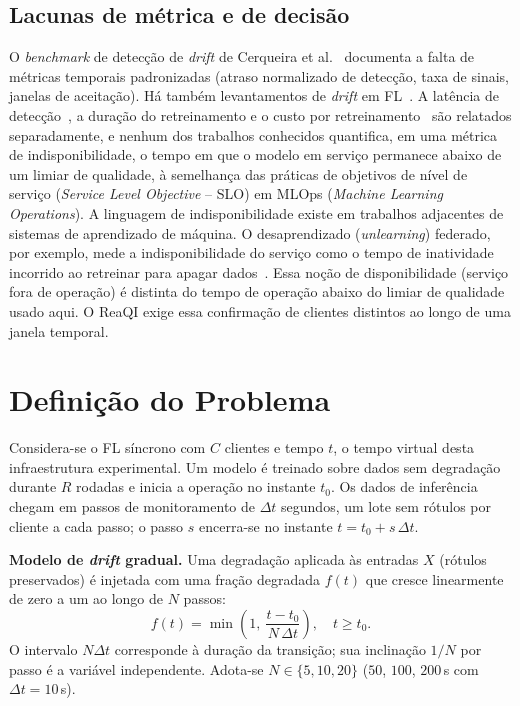 \documentclass[conference]{IEEEtran}
\begin{document}
\subsection{Lacunas de métrica e de decisão}
O \textit{benchmark} de detecção de \textit{drift} de Cerqueira et al.~\cite{cerqueira2026} documenta a falta de métricas temporais padronizadas (atraso normalizado de detecção, taxa de sinais, janelas de aceitação). Há também levantamentos de \textit{drift} em FL~\cite{mahdi2025}. A latência de detecção~\cite{baier2023,chow2023}, a duração do retreinamento e o custo por retreinamento~\cite{han2026} são relatados separadamente, e nenhum dos trabalhos conhecidos quantifica, em uma métrica de indisponibilidade, o tempo em que o modelo em serviço permanece abaixo de um limiar de qualidade, à semelhança das práticas de objetivos de nível de serviço (\textit{Service Level Objective} -- SLO) em MLOps (\textit{Machine Learning Operations}). A linguagem de indisponibilidade existe em trabalhos adjacentes de sistemas de aprendizado de máquina. O desaprendizado (\textit{unlearning}) federado, por exemplo, mede a indisponibilidade do serviço como o tempo de inatividade incorrido ao retreinar para apagar dados~\cite{zhang2025}. Essa noção de disponibilidade (serviço fora de operação) é distinta do tempo de operação abaixo do limiar de qualidade usado aqui. O ReaQI exige essa confirmação de clientes distintos ao longo de uma janela temporal.

\section{Definição do Problema}
Considera-se o FL síncrono com $C$ clientes e tempo $t$, o tempo virtual desta infraestrutura experimental. Um modelo é treinado sobre dados sem degradação durante $R$ rodadas e inicia a operação no instante $t_0$. Os dados de inferência chegam em passos de monitoramento de $\Delta t$ segundos, um lote sem rótulos por cliente a cada passo; o passo $s$ encerra-se no instante $t=t_0+s\,\Delta t$.

\textbf{Modelo de \textit{drift} gradual.} Uma degradação aplicada às entradas $X$ (rótulos preservados) é injetada com uma fração degradada $f(t)$ que cresce linearmente de zero a um ao longo de $N$ passos:
\begin{equation}
f(t) = \min\!\left(1,\ \frac{t-t_0}{N\,\Delta t}\right),
\quad t\ge t_0 .
\label{eq:ramp}
\end{equation}
O intervalo $N\Delta t$ corresponde à duração da transição; sua inclinação $1/N$ por passo é a variável independente. Adota-se $N\in\{5,10,20\}$ ($50$, $100$, $200$\,s com $\Delta t=10$\,s).
\end{document}
